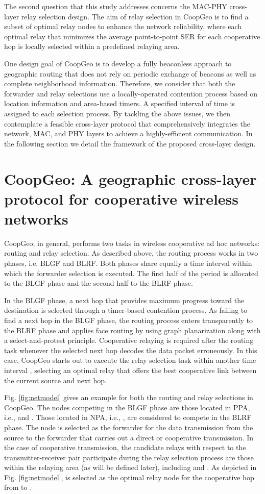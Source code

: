 \documentclass[journal,twoside,final]{IEEEtran}
\begin{document}
The second question that this study addresses concerns the MAC-PHY cross-layer relay selection design. The aim of relay selection in CoopGeo is to find a subset of optimal relay nodes  to enhance the network reliability, where each optimal relay  that minimizes the average point-to-point SER for each cooperative hop is locally selected within a predefined relaying area.

One design goal of CoopGeo is to develop a fully beaconless approach to geographic routing that does not rely on periodic exchange of beacons as well as complete neighborhood information. Therefore, we consider that both the forwarder and relay selections use a locally-operated contention process based on location information and area-based timers. A specified interval of time  is assigned to each selection process.
By tackling the above issues, we then contemplate a feasible cross-layer protocol that comprehensively integrates the network, MAC, and PHY layers to achieve a highly-efficient communication. In the following section we detail the framework of the proposed cross-layer design.

\section{CoopGeo: A geographic cross-layer protocol for cooperative wireless networks}
CoopGeo, in general, performs two tasks in wireless cooperative ad hoc networks: routing and relay selection. As described above, the routing process works in two phases, i.e. BLGF and BLRF. Both phases share equally a time interval  within which the forwarder selection is executed. The first half of the  period is allocated to the BLGF phase and the second half to the BLRF phase.

In the BLGF phase, a next hop that provides maximum progress toward the destination is selected through a timer-based contention process. As failing to find a next hop in the BLGF phase, the routing process enters transparently to the BLRF phase and applies face routing by using graph planarization along with a select-and-protest principle. Cooperative relaying is required after the routing task whenever the selected next hop decodes the data packet erroneously. In this case, CoopGeo starts out to execute the relay selection task within another time interval , selecting an optimal relay that offers the best cooperative link between the current source and next hop.

Fig. \ref{fig:netmodel} gives an example for both the routing and relay selections in CoopGeo. The nodes competing in the BLGF phase are those located in PPA, i.e.,  and . Those located in NPA, i.e., , are considered to compete in the BLRF phase. The node  is selected as the forwarder for the data transmission from the source  to the forwarder  that carries out a direct or cooperative transmission. In the case of cooperative transmission, the candidate relays with respect to the transmitter-receiver pair  participate during the relay selection process are those within the relaying area (as will be defined later), including  and . As depicted in Fig. \ref{fig:netmodel},  is selected as the optimal relay node for the cooperative hop from  to .
\end{document}
